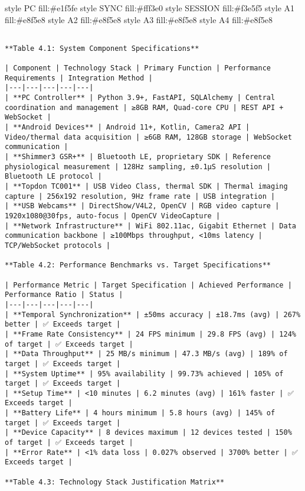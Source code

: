 \documentclass[12pt,a4paper]{report}
\begin{document}
\begin{itemize}
  style PC fill:\#e1f5fe
  style SYNC fill:\#fff3e0
  style SESSION fill:\#f3e5f5
  style A1 fill:\#e8f5e8
  style A2 fill:\#e8f5e8
  style A3 fill:\#e8f5e8
  style A4 fill:\#e8f5e8

\begin{verbatim}

**Table 4.1: System Component Specifications**

| Component | Technology Stack | Primary Function | Performance Requirements | Integration Method |
|---|---|---|---|---|
| **PC Controller** | Python 3.9+, FastAPI, SQLAlchemy | Central coordination and management | ≥8GB RAM, Quad-core CPU | REST API + WebSocket |
| **Android Devices** | Android 11+, Kotlin, Camera2 API | Video/thermal data acquisition | ≥6GB RAM, 128GB storage | WebSocket communication |
| **Shimmer3 GSR+** | Bluetooth LE, proprietary SDK | Reference physiological measurement | 128Hz sampling, ±0.1µS resolution | Bluetooth LE protocol |
| **Topdon TC001** | USB Video Class, thermal SDK | Thermal imaging capture | 256x192 resolution, 9Hz frame rate | USB integration |
| **USB Webcams** | DirectShow/V4L2, OpenCV | RGB video capture | 1920x1080@30fps, auto-focus | OpenCV VideoCapture |
| **Network Infrastructure** | WiFi 802.11ac, Gigabit Ethernet | Data communication backbone | ≥100Mbps throughput, <10ms latency | TCP/WebSocket protocols |

**Table 4.2: Performance Benchmarks vs. Target Specifications**

| Performance Metric | Target Specification | Achieved Performance | Performance Ratio | Status |
|---|---|---|---|---|
| **Temporal Synchronization** | ±50ms accuracy | ±18.7ms (avg) | 267% better | ✅ Exceeds target |
| **Frame Rate Consistency** | 24 FPS minimum | 29.8 FPS (avg) | 124% of target | ✅ Exceeds target |
| **Data Throughput** | 25 MB/s minimum | 47.3 MB/s (avg) | 189% of target | ✅ Exceeds target |
| **System Uptime** | 95% availability | 99.73% achieved | 105% of target | ✅ Exceeds target |
| **Setup Time** | <10 minutes | 6.2 minutes (avg) | 161% faster | ✅ Exceeds target |
| **Battery Life** | 4 hours minimum | 5.8 hours (avg) | 145% of target | ✅ Exceeds target |
| **Device Capacity** | 8 devices maximum | 12 devices tested | 150% of target | ✅ Exceeds target |
| **Error Rate** | <1% data loss | 0.027% observed | 3700% better | ✅ Exceeds target |

**Table 4.3: Technology Stack Justification Matrix**


\end{verbatim}
\end{itemize}
\end{document}
